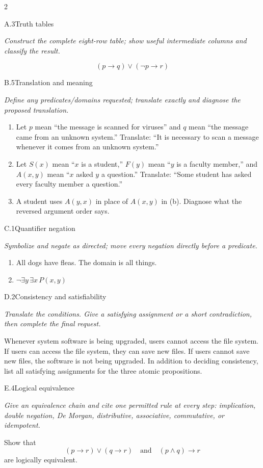 \documentclass[9pt]{extarticle}
\begin{document}
\begin{multicols}{2}
\begin{CoreProblem}{A.3}{Truth tables}
{\scriptsize\textit{Construct the complete eight-row table; show useful intermediate columns and classify the result.}\par}
\[
  (p\to q)\lor(\neg p\to r)
\]
\end{CoreProblem}
\begin{CoreProblem}{B.5}{Translation and meaning}
{\scriptsize\textit{Define any predicates/domains requested; translate exactly and diagnose the proposed translation.}\par}
\begin{enumerate}[label=(\alph*)]
  \item Let $p$ mean ``the message is scanned for viruses'' and $q$ mean ``the
        message came from an unknown system.'' Translate: ``It is necessary to
        scan a message whenever it comes from an unknown system.''
  \item Let $S(x)$ mean ``$x$ is a student,'' $F(y)$ mean ``$y$ is a faculty
        member,'' and $A(x,y)$ mean ``$x$ asked $y$ a question.'' Translate:
        ``Some student has asked every faculty member a question.''
  \item A student uses $A(y,x)$ in place of $A(x,y)$ in (b). Diagnose what the
        reversed argument order says.
\end{enumerate}
\end{CoreProblem}
\begin{CoreProblem}{C.1}{Quantifier negation}
{\scriptsize\textit{Symbolize and negate as directed; move every negation directly before a predicate.}\par}
\begin{enumerate}[label=(\alph*)]
  \item All dogs have fleas. The domain is all things.
  \item $\neg\exists y\,\exists x\,P(x,y)$
\end{enumerate}
\end{CoreProblem}
\columnbreak
\begin{CoreProblem}{D.2}{Consistency and satisfiability}
{\scriptsize\textit{Translate the conditions. Give a satisfying assignment or a short contradiction, then complete the final request.}\par}
Whenever system software is being upgraded, users cannot access the file
system. If users can access the file system, they can save new files. If users
cannot save new files, the software is not being upgraded. In addition to
deciding consistency, list all satisfying assignments for the three atomic
propositions.
\end{CoreProblem}
\begin{CoreProblem}{E.4}{Logical equivalence}
{\scriptsize\textit{Give an equivalence chain and cite one permitted rule at every step: implication, double negation, De Morgan, distributive, associative, commutative, or idempotent.}\par}
Show that
\[
  (p\to r)\lor(q\to r)
  \quad\text{and}\quad
  (p\land q)\to r
\]
are logically equivalent.
\end{CoreProblem}
\end{multicols}
\end{document}
